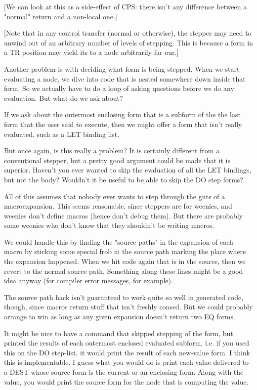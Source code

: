 [We can look at this as a side-effect of CPS: there isn't any difference
between a "normal" return and a non-local one.]

[Note that in any control transfer (normal or otherwise), the stepper may need
to unwind out of an arbitrary number of levels of stepping.  This is because a
form in a TR position may yield its to a node arbitrarily far our.]

Another problem is with deciding what form is being stepped.  When we start
evaluating a node, we dive into code that is nested somewhere down inside that
form.  So we actually have to do a loop of asking questions before we do any
evaluation.  But what do we ask about?

If we ask about the outermost enclosing form that is a subform of the the last
form that the user said to execute, then we might offer a form that isn't
really evaluated, such as a LET binding list.  

But once again, is this really a problem?  It is certainly different from a
conventional stepper, but a pretty good argument could be made that it is
superior.  Haven't you ever wanted to skip the evaluation of all the
LET bindings, but not the body?  Wouldn't it be useful to be able to skip the
DO step forms?

All of this assumes that nobody ever wants to step through the guts of a
macroexpansion.  This seems reasonable, since steppers are for weenies, and
weenies don't define macros (hence don't debug them).  But there are probably
some weenies who don't know that they shouldn't be writing macros.

We could handle this by finding the "source paths" in the expansion of each
macro by sticking some special frob in the source path marking the place where
the expansion happened.  When we hit code again that is in the source, then we
revert to the normal source path.  Something along these lines might be a good
idea anyway (for compiler error messages, for example).  

The source path hack isn't guaranteed to work quite so well in generated code,
though, since macros return stuff that isn't freshly consed.  But we could
probably arrange to win as long as any given expansion doesn't return two EQ
forms.

It might be nice to have a command that skipped stepping of the form, but
printed the results of each outermost enclosed evaluated subform, i.e. if you
used this on the DO step-list, it would print the result of each new-value
form.  I think this is implementable.  I guess what you would do is print each
value delivered to a DEST whose source form is the current or an enclosing
form.  Along with the value, you would print the source form for the node that
is computing the value.

